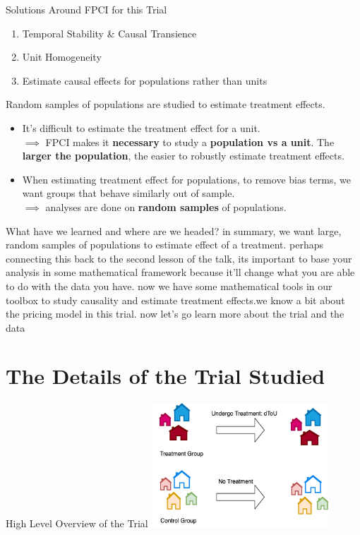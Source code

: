 \documentclass{beamer}
\begin{document}
\begin{frame}{Solutions Around FPCI for this Trial}
  \begin{enumerate}
    \item Temporal Stability \& Causal Transience {\color{red}{X}}
    \item Unit Homogeneity {\color{red}{X}}
    \item Estimate causal effects for populations rather than units {\color{green}{\checkmark}}
  \end{enumerate}
\end{frame}

\begin{frame}{Random samples of populations are studied to estimate treatment effects.}
  \begin{itemize}
    \item<+-> It's difficult to estimate the treatment effect for a unit. \\
    \indent $\implies$ FPCI makes it \textbf{necessary} to study a \textbf{population vs a unit}. The \textbf{larger the population}, the easier to robustly estimate treatment effects.
    \item<+-> When estimating treatment effect for populations, to remove bias terms, we want groups that behave similarly out of sample. \\
    \indent $\implies$ analyses are done on \textbf{random samples} of populations.
  \end{itemize}
\end{frame}

\begin{frame}{What have we learned and where are we headed?}
  in summary, we want large, random samples of populations to estimate effect of a treatment.
  perhaps connecting this back to the second lesson of the talk, its important to base your analysis in some mathematical framework because it'll change what you are able to do with the data you have.
  now we have some mathematical tools in our toolbox to study causality and estimate treatment effects.we know a bit about the 
  pricing model in this trial. now let's go learn more about the trial and the data
\end{frame}

\section{The Details of the Trial Studied}

\begin{frame}{High Level Overview of the Trial}
  \centering
  \includegraphics[width=0.5\textwidth]{images/trial-high-level.png}
\end{frame}
\end{document}

